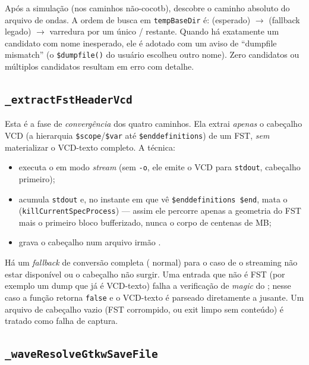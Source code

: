 Após a simulação (nos caminhos não-cocotb), descobre o caminho absoluto do
arquivo de ondas. A ordem de busca em \lstinline|tempBaseDir| é:
 (esperado) $\rightarrow$  (fallback legado)
$\rightarrow$ varredura por um único / restante. Quando há
exatamente um candidato com nome inesperado, ele é adotado com um aviso de
\enquote{dumpfile mismatch} (o \lstinline|$dumpfile()| do usuário escolheu outro
nome). Zero candidatos ou múltiplos candidatos resultam em erro com detalhe.

\subsection{\texttt{\_extractFstHeaderVcd}}

Esta é a fase de \emph{convergência} dos quatro caminhos. Ela extrai
\emph{apenas} o cabeçalho VCD (a hierarquia \lstinline|$scope|/\lstinline|$var|
até \lstinline|$enddefinitions|) de um FST, \emph{sem} materializar o VCD-texto
completo. A técnica:

\begin{itemize}[leftmargin=*]
  \item executa o  em modo \emph{stream} (sem \lstinline|-o|, ele
    emite o VCD para \lstinline|stdout|, cabeçalho primeiro);
  \item acumula \lstinline|stdout| e, no instante em que vê
    \lstinline|$enddefinitions $end|, mata o 
    (\lstinline|killCurrentSpecProcess|) --- assim ele percorre apenas a
    geometria do FST mais o primeiro bloco bufferizado, nunca o corpo de
    centenas de MB;
  \item grava o cabeçalho num arquivo irmão .
\end{itemize}

Há um \emph{fallback} de conversão completa ( normal) para o caso
de o streaming não estar disponível ou o cabeçalho não surgir. Uma entrada que
não é FST (por exemplo um dump que já é VCD-texto) falha a verificação de
\emph{magic} do ; nesse caso a função retorna \lstinline|false| e
o VCD-texto é parseado diretamente a jusante. Um arquivo de cabeçalho vazio
(FST corrompido, ou exit limpo sem conteúdo) é tratado como falha de captura.

\subsection{\texttt{\_waveResolveGtkwSaveFile}}

